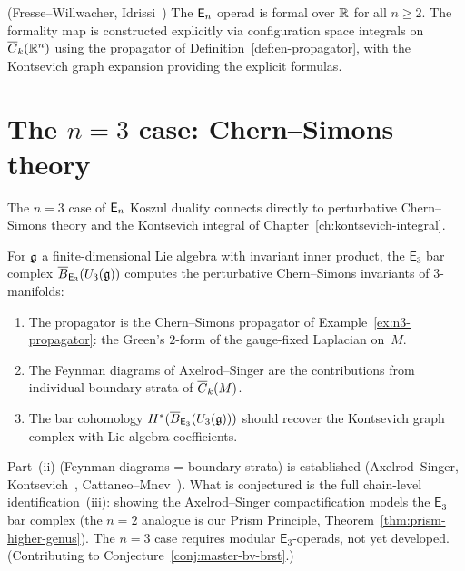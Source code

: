 \begin{proposition}[\texorpdfstring{$\En$}{En} formality for \texorpdfstring{$n \geq 2$}{n >= 2};
\ClaimStatusProvedElsewhere]
\label{prop:en-formality}
\textup{(}Fresse--Willwacher, Idrissi~\cite{Idrissi22}\textup{)}\quad
The $\En$ operad is formal over $\mathbb{R}$ for all $n \geq 2$.
The formality map is constructed explicitly via configuration
space integrals on $\overline{C}_k(\mathbb{R}^n)$ using the propagator
of Definition~\textup{\ref{def:en-propagator}}, with the Kontsevich
graph expansion providing the explicit formulas.
\end{proposition}



\section{\texorpdfstring{The $n = 3$ case: Chern--Simons theory}{The n = 3 case: Chern--Simons theory}}
\label{sec:n3-chern-simons}

The $n = 3$ case of $\En$ Koszul duality connects directly to
perturbative Chern--Simons theory and the Kontsevich integral
of Chapter~\ref{ch:kontsevich-integral}.

\begin{conjecture}
\label{conj:e3-chern-simons}
For $\mathfrak{g}$ a finite-dimensional Lie algebra with invariant inner
product, the $\mathsf{E}_3$ bar complex
$\overline{B}_{\mathsf{E}_3}(U_3(\mathfrak{g}))$ computes the perturbative
Chern--Simons invariants of $3$-manifolds:
\begin{enumerate}[label=\textup{(\roman*)}]
\item The propagator is the Chern--Simons propagator of
  Example~\textup{\ref{ex:n3-propagator}}: the Green's $2$-form
  of the gauge-fixed Laplacian on~$M$.
\item The Feynman diagrams of Axelrod--Singer are the
  contributions from individual boundary strata of
  $\overline{C}_k(M)$.
\item The bar cohomology
  $H^*(\overline{B}_{\mathsf{E}_3}(U_3(\mathfrak{g})))$
  should recover the Kontsevich graph complex with Lie algebra
  coefficients.
\end{enumerate}
\end{conjecture}

\begin{remark}[Scope]
\label{rem:e3-scope}
Part~(ii) (Feynman diagrams = boundary strata) is established
(Axelrod--Singer, Kontsevich~\cite{Kon94}, Cattaneo--Mnev~\cite{CattaneoMnev10}).
What is conjectured is the full chain-level identification~(iii):
showing the Axelrod--Singer compactification models the
$\mathsf{E}_3$ bar complex (the $n = 2$ analogue is our
Prism Principle, Theorem~\ref{thm:prism-higher-genus}).
The $n = 3$ case requires modular $\mathsf{E}_3$-operads, not yet
developed.  (Contributing to Conjecture~\ref{conj:master-bv-brst}.)
\end{remark}



